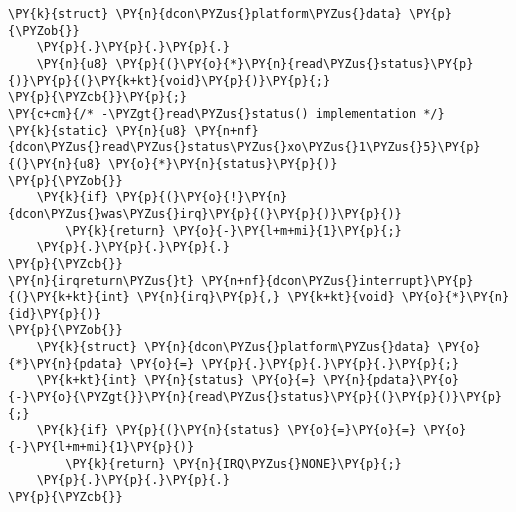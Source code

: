 \begin{Verbatim}[commandchars=\\\{\},codes={\catcode`\$=3\catcode`\^=7\catcode`\_=8}]
\PY{k}{struct} \PY{n}{dcon\PYZus{}platform\PYZus{}data} \PY{p}{\PYZob{}}
    \PY{p}{.}\PY{p}{.}\PY{p}{.}
    \PY{n}{u8} \PY{p}{(}\PY{o}{*}\PY{n}{read\PYZus{}status}\PY{p}{)}\PY{p}{(}\PY{k+kt}{void}\PY{p}{)}\PY{p}{;}
\PY{p}{\PYZcb{}}\PY{p}{;}
\PY{c+cm}{/* -\PYZgt{}read\PYZus{}status() implementation */}
\PY{k}{static} \PY{n}{u8} \PY{n+nf}{dcon\PYZus{}read\PYZus{}status\PYZus{}xo\PYZus{}1\PYZus{}5}\PY{p}{(}\PY{n}{u8} \PY{o}{*}\PY{n}{status}\PY{p}{)}
\PY{p}{\PYZob{}}
    \PY{k}{if} \PY{p}{(}\PY{o}{!}\PY{n}{dcon\PYZus{}was\PYZus{}irq}\PY{p}{(}\PY{p}{)}\PY{p}{)}
        \PY{k}{return} \PY{o}{-}\PY{l+m+mi}{1}\PY{p}{;}
    \PY{p}{.}\PY{p}{.}\PY{p}{.}
\PY{p}{\PYZcb{}}
\PY{n}{irqreturn\PYZus{}t} \PY{n+nf}{dcon\PYZus{}interrupt}\PY{p}{(}\PY{k+kt}{int} \PY{n}{irq}\PY{p}{,} \PY{k+kt}{void} \PY{o}{*}\PY{n}{id}\PY{p}{)}
\PY{p}{\PYZob{}}
    \PY{k}{struct} \PY{n}{dcon\PYZus{}platform\PYZus{}data} \PY{o}{*}\PY{n}{pdata} \PY{o}{=} \PY{p}{.}\PY{p}{.}\PY{p}{.}\PY{p}{;}
    \PY{k+kt}{int} \PY{n}{status} \PY{o}{=} \PY{n}{pdata}\PY{o}{-}\PY{o}{\PYZgt{}}\PY{n}{read\PYZus{}status}\PY{p}{(}\PY{p}{)}\PY{p}{;}
    \PY{k}{if} \PY{p}{(}\PY{n}{status} \PY{o}{=}\PY{o}{=} \PY{o}{-}\PY{l+m+mi}{1}\PY{p}{)}
        \PY{k}{return} \PY{n}{IRQ\PYZus{}NONE}\PY{p}{;}
    \PY{p}{.}\PY{p}{.}\PY{p}{.}
\PY{p}{\PYZcb{}}
\end{Verbatim}
